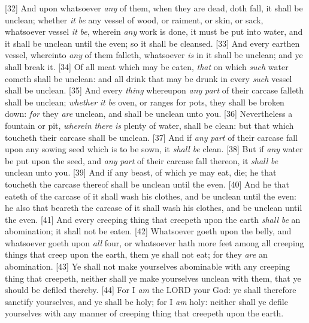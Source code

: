 [32] \textcolor[cmyk]{0.99998,1,0,0}{And upon whatsoever \emph{any} of them, when they are dead, doth fall, it shall be unclean; whether \emph{it} \emph{be} any vessel of wood, or raiment, or skin, or sack, whatsoever vessel \emph{it} \emph{be}, wherein \emph{any} work is done, it must be put into water, and it shall be unclean until the even; so it shall be cleansed.}
[33] \textcolor[cmyk]{0.99998,1,0,0}{And every earthen vessel, whereinto \emph{any} of them falleth, whatsoever \emph{is} in it shall be unclean; and ye shall break it.}
[34] \textcolor[cmyk]{0.99998,1,0,0}{Of all meat which may be eaten, \emph{that} on which \emph{such} water cometh shall be unclean: and all drink that may be drunk in every \emph{such} vessel shall be unclean.}
[35] \textcolor[cmyk]{0.99998,1,0,0}{And every \emph{thing} whereupon \emph{any} \emph{part} of their carcase falleth shall be unclean; \emph{whether} \emph{it} \emph{be} oven, or ranges for pots, they shall be broken down: \emph{for} they \emph{are} unclean, and shall be unclean unto you.}
[36] \textcolor[cmyk]{0.99998,1,0,0}{Nevertheless a fountain or pit, \emph{wherein} \emph{there} \emph{is} plenty of water, shall be clean: but that which toucheth their carcase shall be unclean.}
[37] \textcolor[cmyk]{0.99998,1,0,0}{And if \emph{any} \emph{part} of their carcase fall upon any sowing seed which is to be sown, it \emph{shall} \emph{be} clean.}
[38] \textcolor[cmyk]{0.99998,1,0,0}{But if \emph{any} water be put upon the seed, and \emph{any} \emph{part} of their carcase fall thereon, it \emph{shall} \emph{be} unclean unto you.}
[39] \textcolor[cmyk]{0.99998,1,0,0}{And if any beast, of which ye may eat, die; he that toucheth the carcase thereof shall be unclean until the even.}
[40] \textcolor[cmyk]{0.99998,1,0,0}{And he that eateth of the carcase of it shall wash his clothes, and be unclean until the even: he also that beareth the carcase of it shall wash his clothes, and be unclean until the even.}
[41] \textcolor[cmyk]{0.99998,1,0,0}{And every creeping thing that creepeth upon the earth \emph{shall} \emph{be} an abomination; it shall not be eaten.}
[42] \textcolor[cmyk]{0.99998,1,0,0}{Whatsoever goeth upon the belly, and whatsoever goeth upon \emph{all} four, or whatsoever hath more feet among all creeping things that creep upon the earth, them ye shall not eat; for they \emph{are} an abomination.}
[43] \textcolor[cmyk]{0.99998,1,0,0}{Ye shall not make yourselves abominable with any creeping thing that creepeth, neither shall ye make yourselves unclean with them, that ye should be defiled thereby.}
[44] \textcolor[cmyk]{0.99998,1,0,0}{For I \emph{am} the LORD your God: ye shall therefore sanctify yourselves, and ye shall be holy; for I \emph{am} holy: neither shall ye defile yourselves with any manner of creeping thing that creepeth upon the earth.}
